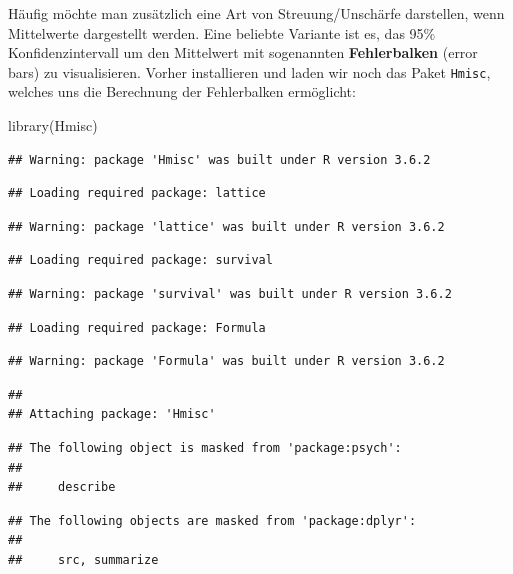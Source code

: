 \documentclass[
]{book}
\newenvironment{Shaded}{\begin{snugshade}}{\end{snugshade}}
\newcommand{\FunctionTok}[1]{\textcolor[rgb]{0.00,0.00,0.00}{#1}}
\newcommand{\NormalTok}[1]{#1}
\begin{document}
Häufig möchte man zusätzlich eine Art von Streuung/Unschärfe darstellen, wenn Mittelwerte dargestellt werden. Eine beliebte Variante ist es, das 95\% Konfidenzintervall um den Mittelwert mit sogenannten \textbf{Fehlerbalken} (error bars) zu visualisieren. Vorher installieren und laden wir noch das Paket \texttt{Hmisc}, welches uns die Berechnung der Fehlerbalken ermöglicht:

\begin{Shaded}
\begin{Highlighting}[]
\FunctionTok{library}\NormalTok{(Hmisc)}
\end{Highlighting}
\end{Shaded}

\begin{verbatim}
## Warning: package 'Hmisc' was built under R version 3.6.2
\end{verbatim}

\begin{verbatim}
## Loading required package: lattice
\end{verbatim}

\begin{verbatim}
## Warning: package 'lattice' was built under R version 3.6.2
\end{verbatim}

\begin{verbatim}
## Loading required package: survival
\end{verbatim}

\begin{verbatim}
## Warning: package 'survival' was built under R version 3.6.2
\end{verbatim}

\begin{verbatim}
## Loading required package: Formula
\end{verbatim}

\begin{verbatim}
## Warning: package 'Formula' was built under R version 3.6.2
\end{verbatim}

\begin{verbatim}
## 
## Attaching package: 'Hmisc'
\end{verbatim}

\begin{verbatim}
## The following object is masked from 'package:psych':
## 
##     describe
\end{verbatim}

\begin{verbatim}
## The following objects are masked from 'package:dplyr':
## 
##     src, summarize
\end{verbatim}
\end{document}
